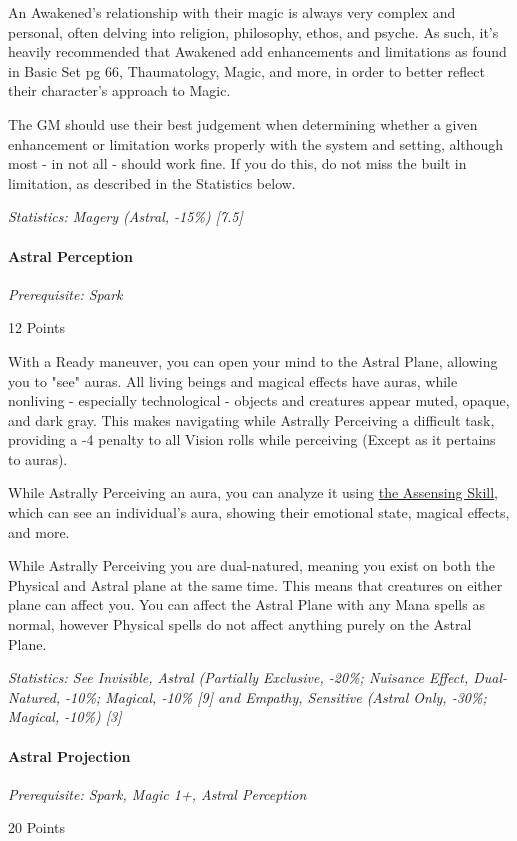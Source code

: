 \begin{multicols*}{3}
	An Awakened's relationship with their magic is always very complex and personal, often delving into religion, philosophy, ethos, and psyche. As such, it's heavily recommended that Awakened add enhancements and limitations as found in Basic Set pg 66, Thaumatology, Magic, and more, in order to better reflect their character's approach to Magic.
	
	The GM should use their best judgement when determining whether a given enhancement or limitation works properly with the system and setting, although most - in not all - should work fine. If you do this, do not miss the built in limitation, as described in the Statistics below.
	
	\textit{\textcolor{OliveGreen}{Statistics: Magery (Astral, -15\%) [7.5]}}
	
	\paragraph{Astral Perception}\label{astral_perception}
	\textit{Prerequisite: Spark}
	\begin{flushright}
		12 Points
	\end{flushright}
	
	With a Ready maneuver, you can open your mind to the Astral Plane, allowing you to "see" auras. All living beings and magical effects have auras, while nonliving - especially technological - objects and creatures appear muted, opaque, and dark gray. This makes navigating while Astrally Perceiving a difficult task, providing a -4 penalty to all Vision rolls while perceiving (Except as it pertains to auras). 
	
	While Astrally Perceiving an aura, you can analyze it using \hyperref[assensing_skill]{the Assensing Skill,} which can see an individual's aura, showing their emotional state, magical effects, and more.
	
	While Astrally Perceiving you are dual-natured, meaning you exist on both the Physical and Astral plane at the same time. This means that creatures on either plane can affect you. You can affect the Astral Plane with any Mana spells as normal, however Physical spells do not affect anything purely on the Astral Plane.
	
	\textit{\textcolor{OliveGreen}{Statistics: See Invisible, Astral (Partially Exclusive, -20\%; Nuisance Effect, Dual-Natured, -10\%; Magical, -10\% [9] and Empathy, Sensitive (Astral Only, -30\%; Magical, -10\%) [3]}}
	
	\paragraph{Astral Projection}\label{astral_projection}
	\textit{Prerequisite: Spark, Magic 1+, Astral Perception}
	\begin{flushright}
		20 Points
	\end{flushright}
	

\end{multicols*}
